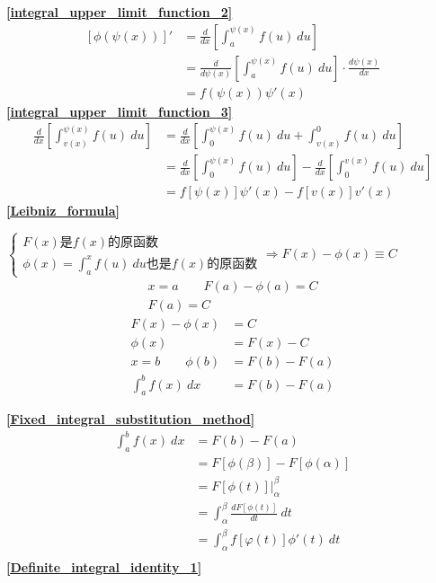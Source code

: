 \textbf{\large \ref{integral_upper_limit_function_2}}
\begin{align*}
		\left[\phi(\psi (x))\right]'&=\frac{d}{dx}\left[\int_{a}^{\psi(x)}f(u)\ du\right]\\
	&=\frac{d}{d\psi(x)}\left[\int_{a}^{\psi(x)}f(u)\ du\right]\cdot\frac{d\psi(x)}{dx}\\
	&=f(\psi(x))\psi'(x)
\end{align*}
\textbf{\large \ref{integral_upper_limit_function_3}}
\begin{align*}
	\frac{d}{dx}\left[\int_{v(x)}^{\psi(x)}f(u)\ du\right]&=\frac{d}{dx}\left[\int_{0}^{\psi(x)}f(u)\ du+\int_{v(x)}^{0}f(u)\ du\right]\\
	&=\frac{d}{dx}\left[\int_{0}^{\psi(x)}f(u)\ du\right]-\frac{d}{dx}\left[\int_{0}^{v(x)}f(u)\ du\right]\\
	&=f\left[\psi(x)\right]\psi'(x)-f\left[v(x)\right]v'(x)
\end{align*}
\textbf{\large \ref{Leibniz_formula}}
\begin{center}
	$\begin{cases}
		F(x)\mbox{是}f(x)\mbox{的原函数}\\
		\phi(x)=\int_{a}^{x}f(u)\ du\mbox{也是}f(x)\mbox{的原函数}
	\end{cases}\Rightarrow F(x)-\phi(x)\equiv C$
	\begin{align*}
		x=a\qquad F(a)-\phi(a)=C\\
		F(a)=C
	\end{align*}
	\begin{align*}
		F(x)-\phi(x)&=C\\
		\phi(x)&=F(x)-C\\
		x=b\qquad \phi(b)&=F(b)-F(a)\\
		\int_{a}^{b}f(x)\ dx&=F(b)-F(a)
	\end{align*}
\end{center}
 \textbf{\large \ref{Fixed_integral_substitution_method}}
 \begin{align*}
	\int_{a}^{b}f(x)\ dx&=F(b)-F(a) \\
	&=F\left[\phi(\beta)\right]-F\left[\phi(\alpha)\right]\\
	&=\left.F\left[\phi(t)\right]\right|_\alpha^\beta\\
	&=\int_{\alpha}^{\beta}\frac{d F\left[\phi(t)\right]}{dt} \ dt\\
	&=\int_{\alpha}^{\beta} f\left[\varphi(t)\right]\phi'(t)\ dt\\
\end{align*}
 \textbf{\large \ref{Definite_integral_identity_1}}
